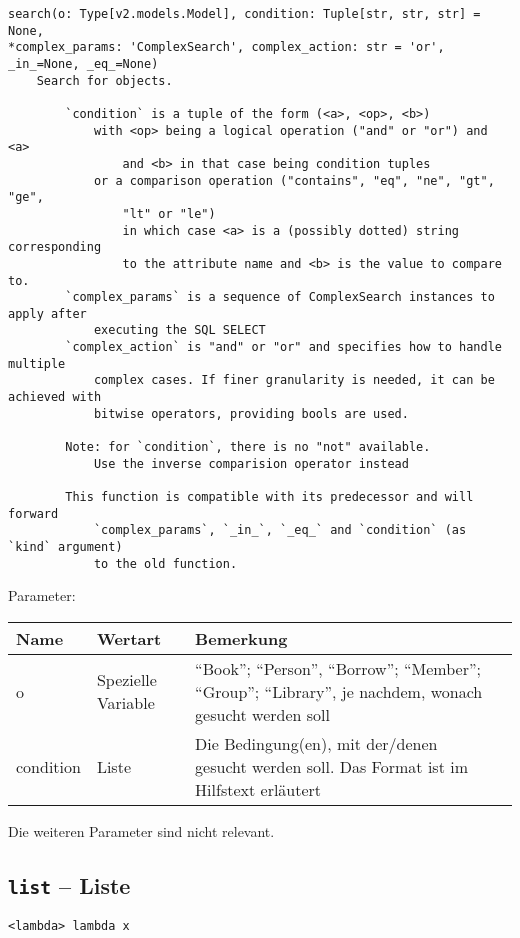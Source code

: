 \begin{verbatim}
search(o: Type[v2.models.Model], condition: Tuple[str, str, str] = None,
*complex_params: 'ComplexSearch', complex_action: str = 'or',
_in_=None, _eq_=None)
    Search for objects.

        `condition` is a tuple of the form (<a>, <op>, <b>)
            with <op> being a logical operation ("and" or "or") and <a>
                and <b> in that case being condition tuples
            or a comparison operation ("contains", "eq", "ne", "gt", "ge", 
                "lt" or "le")
                in which case <a> is a (possibly dotted) string corresponding
                to the attribute name and <b> is the value to compare to.
        `complex_params` is a sequence of ComplexSearch instances to apply after
            executing the SQL SELECT
        `complex_action` is "and" or "or" and specifies how to handle multiple
            complex cases. If finer granularity is needed, it can be achieved with
            bitwise operators, providing bools are used.

        Note: for `condition`, there is no "not" available.
            Use the inverse comparision operator instead

        This function is compatible with its predecessor and will forward
            `complex_params`, `_in_`, `_eq_` and `condition` (as `kind` argument)
            to the old function.
\end{verbatim}

Parameter:

\begin{tabular}{|p{}|p{}|p{}|p{}|}
Name & Wertart & Bemerkung \\
\hline
o & Spezielle Variable & ``Book''; ``Person'', ``Borrow''; ``Member''; ``Group''; ``Library'', je nachdem, wonach gesucht werden soll\\
condition & Liste & Die Bedingung(en), mit der/denen gesucht werden soll. Das Format ist im Hilfstext erläutert\\
\end{tabular}
Die weiteren Parameter sind nicht relevant.


\subsection{\texttt{list} -- Liste}
\label{subsec:command_list:list}

\begin{verbatim}
<lambda> lambda x
\end{verbatim}

